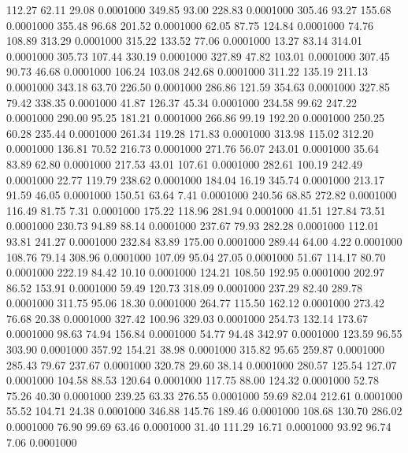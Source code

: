  112.27   62.11   29.08   0.0001000
 349.85   93.00  228.83   0.0001000
 305.46   93.27  155.68   0.0001000
 355.48   96.68  201.52   0.0001000
  62.05   87.75  124.84   0.0001000
  74.76  108.89  313.29   0.0001000
 315.22  133.52   77.06   0.0001000
  13.27   83.14  314.01   0.0001000
 305.73  107.44  330.19   0.0001000
 327.89   47.82  103.01   0.0001000
 307.45   90.73   46.68   0.0001000
 106.24  103.08  242.68   0.0001000
 311.22  135.19  211.13   0.0001000
 343.18   63.70  226.50   0.0001000
 286.86  121.59  354.63   0.0001000
 327.85   79.42  338.35   0.0001000
  41.87  126.37   45.34   0.0001000
 234.58   99.62  247.22   0.0001000
 290.00   95.25  181.21   0.0001000
 266.86   99.19  192.20   0.0001000
 250.25   60.28  235.44   0.0001000
 261.34  119.28  171.83   0.0001000
 313.98  115.02  312.20   0.0001000
 136.81   70.52  216.73   0.0001000
 271.76   56.07  243.01   0.0001000
  35.64   83.89   62.80   0.0001000
 217.53   43.01  107.61   0.0001000
 282.61  100.19  242.49   0.0001000
  22.77  119.79  238.62   0.0001000
 184.04   16.19  345.74   0.0001000
 213.17   91.59   46.05   0.0001000
 150.51   63.64    7.41   0.0001000
 240.56   68.85  272.82   0.0001000
 116.49   81.75    7.31   0.0001000
 175.22  118.96  281.94   0.0001000
  41.51  127.84   73.51   0.0001000
 230.73   94.89   88.14   0.0001000
 237.67   79.93  282.28   0.0001000
 112.01   93.81  241.27   0.0001000
 232.84   83.89  175.00   0.0001000
 289.44   64.00    4.22   0.0001000
 108.76   79.14  308.96   0.0001000
 107.09   95.04   27.05   0.0001000
  51.67  114.17   80.70   0.0001000
 222.19   84.42   10.10   0.0001000
 124.21  108.50  192.95   0.0001000
 202.97   86.52  153.91   0.0001000
  59.49  120.73  318.09   0.0001000
 237.29   82.40  289.78   0.0001000
 311.75   95.06   18.30   0.0001000
 264.77  115.50  162.12   0.0001000
 273.42   76.68   20.38   0.0001000
 327.42  100.96  329.03   0.0001000
 254.73  132.14  173.67   0.0001000
  98.63   74.94  156.84   0.0001000
  54.77   94.48  342.97   0.0001000
 123.59   96.55  303.90   0.0001000
 357.92  154.21   38.98   0.0001000
 315.82   95.65  259.87   0.0001000
 285.43   79.67  237.67   0.0001000
 320.78   29.60   38.14   0.0001000
 280.57  125.54  127.07   0.0001000
 104.58   88.53  120.64   0.0001000
 117.75   88.00  124.32   0.0001000
  52.78   75.26   40.30   0.0001000
 239.25   63.33  276.55   0.0001000
  59.69   82.04  212.61   0.0001000
  55.52  104.71   24.38   0.0001000
 346.88  145.76  189.46   0.0001000
 108.68  130.70  286.02   0.0001000
  76.90   99.69   63.46   0.0001000
  31.40  111.29   16.71   0.0001000
  93.92   96.74    7.06   0.0001000
